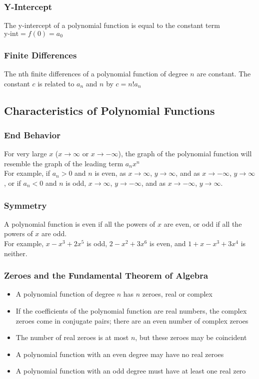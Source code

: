\documentclass{article}
\begin{document}
	\subsubsection{Y-Intercept}
	The y-intercept of a polynomial function is equal to the constant term $\text{y-int}=f(0)=a_0$
	\subsubsection{Finite Differences}
	The nth finite differences of a polynomial function of degree $n$ are constant. The constant $c$ is related to $a_n$ and $n$ by $c=n!a_n$
	\subsection{Characteristics of Polynomial Functions}
	\subsubsection{End Behavior}
	For very large $x$ ($x\to\infty$ or $x\to-\infty$), the graph of the polynomial function will resemble the graph of the leading term $a_nx^n$\\
	For example, if $a_n>0$ and $n$ is even, as $x\to\infty$, $y\to\infty$, and as $x\to-\infty$, $y\to\infty$, or if $a_n<0$ and $n$ is odd, $x\to\infty$, $y\to-\infty$, and as $x\to-\infty$, $y\to\infty$.
	\subsubsection{Symmetry}
	A polynomial function is even if all the powers of $x$ are even, or odd if all the powers of $x$ are odd.\\
	For example, $x-x^3+2x^5$ is odd, $2-x^2+3x^6$ is even, and $1+x-x^3+3x^4$ is neither.
	\subsubsection{Zeroes and the Fundamental Theorem of Algebra}
	\begin{itemize}
		\item A polynomial function of degree $n$ has $n$ zeroes, real or complex
		\item If the coefficients of the polynomial function are real numbers, the complex zeroes come in conjugate pairs; there are an even number of complex zeroes
		\item The number of real zeroes is at most $n$, but these zeroes may be coincident
		\item A polynomial function with an even degree may have no real zeroes
		\item A polynomial function with an odd degree must have at least one real zero
	\end{itemize}
\end{document}
